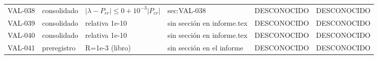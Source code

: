 \begin{longtable}{@{}ll>{\raggedright\arraybackslash}p{4.6cm}lll@{}}
VAL-038 & consolidado & \(\lvert\lambda-P_{cr}\rvert\le 0+10^{-3}\lvert P_{cr}\rvert\) & sec:VAL-038 & DESCONOCIDO & DESCONOCIDO \\
VAL-039 & consolidado & relativa 1e-10 & sin sección en informe.tex & DESCONOCIDO & DESCONOCIDO \\
VAL-040 & consolidado & relativa 1e-10 & sin sección en informe.tex & DESCONOCIDO & DESCONOCIDO \\
VAL-041 & preregistro & R=1e-3 (libro) & sin sección en el informe & DESCONOCIDO & DESCONOCIDO \\
\bottomrule
\end{longtable}
